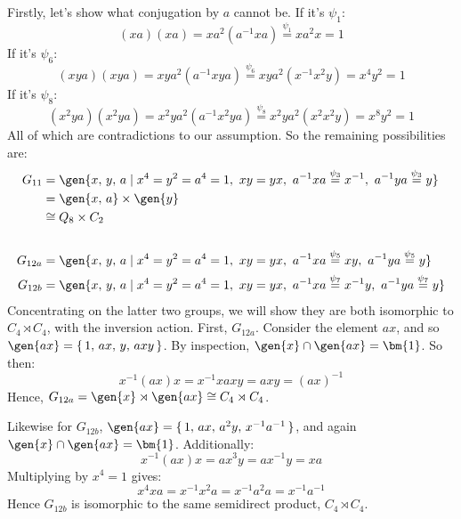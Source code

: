\begin{enumerate}
\begin{enumerate}[\bfseries A:]
                Firstly, let's show what conjugation by \(a\) cannot be.
                If it's \(\psi_1\):
                \[(xa)(xa) = xa^2(a^{-1}xa) \overset{\psi_1}{=} xa^2 x = 1\]
                If it's \(\psi_6\):
                \[(xya)(xya) = xya^2(a^{-1}xya) \overset{\psi_6}{=} xya^2(x^{-1}x^2y) = x^4 y^2 = 1\]
                If it's \(\psi_8\):
                \[(x^2 ya)(x^2 ya) = x^2 ya^2 (a^{-1}x^2 ya) \overset{\psi_8}{=} x^2 ya^2(x^2 x^2 y) = x^8 y^2 = 1\]
                All of which are contradictions to our assumption.
                So the remaining possibilities are:
                \begin{align*}
                    G_{11} &= \gen{x,\,y,\,a \mid x^4 = y^2 = a^4 = 1,\ xy = yx,\ a^{-1}xa \overset{\psi_3}{=} x^{-1},\ a^{-1}ya \overset{\psi_3}{=} y} \\
                        &= \gen{x,\,a} \times \gen{y} \\
                        &\cong Q_8 \times C_2 \\
                        & \\
                    G_{12a} &= \gen{x,\,y,\,a \mid x^4 = y^2 = a^4 = 1,\ xy = yx,\ a^{-1}xa \overset{\psi_5}{=} xy,\ a^{-1}ya \overset{\psi_5}{=} y} \\
                    G_{12b} &= \gen{x,\,y,\,a \mid x^4 = y^2 = a^4 = 1,\ xy = yx,\ a^{-1}xa \overset{\psi_7}{=} x^{-1}y,\ a^{-1}ya \overset{\psi_7}{=} y}
                \end{align*}
                Concentrating on the latter two groups, we will show they are both isomorphic to \(C_4 \rtimes C_4\),
                with the inversion action.
                First, \(G_{12a}\).
                Consider the element \(ax\), and so \(\gen{ax} = \{\,1,\,ax,\,y,\,axy\,\}\).
                By inspection, \(\gen{x} \cap \gen{ax} = \bm{1}\).
                So then:
                \[x^{-1}(ax)x = x^{-1}xaxy = axy = {(ax)}^{-1}\]
                Hence, \(G_{12a} = \gen{x} \rtimes \gen{ax} \cong C_4 \rtimes C_4\).

                Likewise for \(G_{12b}\), \(\gen{ax} = \{\,1,\,ax,\,a^2 y,\,x^{-1}a^{-1}\,\}\), and again \(\gen{x} \cap
                \gen{ax} = \bm{1}\).
                Additionally:
                \[x^{-1}(ax)x = ax^3 y = ax^{-1}y = xa\]
                Multiplying by \(x^4 = 1\) gives:
                \[x^4 xa = x^{-1}x^2 a = x^{-1}a^2 a = x^{-1}a^{-1}\]
                Hence \(G_{12b}\) is isomorphic to the same semidirect product, \(C_4 \rtimes C_4\).


\end{enumerate}
\end{enumerate}
